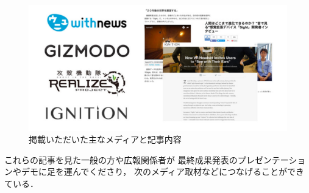 \begin{figure}[h]
\begin{center}
\includegraphics[width=120mm, bb=0 0 674 330]{images/publicity/publicity.png}
\caption{掲載いただいた主なメディアと記事内容}
\end{center}
\end{figure}



これらの記事を見た一般の方や広報関係者が
最終成果発表のプレゼンテーションやデモに足を運んでくださり，
次のメディア取材などにつなげることができている．
